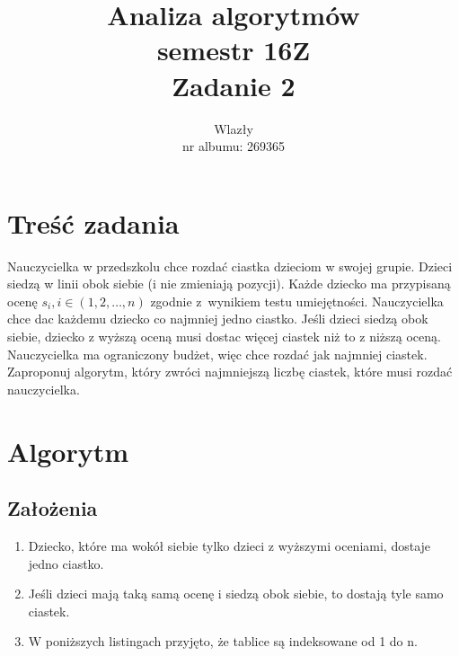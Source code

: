 \documentclass{article}
\title{\vspace{7cm}\LARGE Analiza algorytmów\\semestr 16Z\\Zadanie 2}
\author{\LargeŁukasz Wlazły\\nr albumu: 269365}
\date{}
\begin{document}
	\maketitle
	\newpage

	\section{Treść zadania}

	Nauczycielka w przedszkolu chce rozdać ciastka dzieciom w swojej grupie. Dzieci siedzą w linii obok siebie (i nie zmieniają pozycji). Każde dziecko ma przypisaną ocenę $  s_{i}, i \in (1, 2, \ldots, n) $ zgodnie z~wynikiem testu umiejętności.
	Nauczycielka chce dac każdemu dziecko co najmniej jedno ciastko. Jeśli dzieci siedzą obok siebie, dziecko z wyższą oceną musi dostac więcej ciastek niż to z niższą oceną. Nauczycielka ma ograniczony budżet, więc chce rozdać jak najmniej ciastek. Zaproponuj algorytm, który zwróci najmniejszą liczbę ciastek, które musi rozdać nauczycielka.

	\section{Algorytm}

	\subsection{Założenia}

	\begin{enumerate}
		\item Dziecko, które ma wokół siebie tylko dzieci z wyższymi oceniami, dostaje jedno ciastko.
		\item Jeśli dzieci mają taką samą ocenę i siedzą obok siebie, to dostają tyle samo ciastek.
		\item W poniższych listingach przyjęto, że tablice są indeksowane od 1 do n.
	\end{enumerate}

	\newpage
\end{document}
